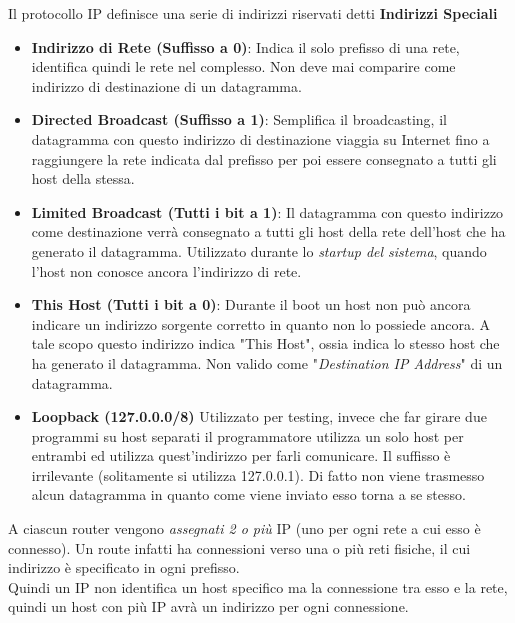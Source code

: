 \documentclass{article}
\newcounter{subsubsubsection}[subsubsection]
\begin{document}
                    Il protocollo IP definisce una serie di indirizzi riservati detti \textbf{Indirizzi Speciali}
                    \begin{itemize}
                        \item \textbf{Indirizzo di Rete (Suffisso a 0)}: Indica il solo prefisso di una rete, identifica quindi le rete nel complesso. Non deve mai comparire come indirizzo di destinazione di un datagramma.
                        \item \textbf{Directed Broadcast (Suffisso a 1)}: Semplifica il broadcasting, il datagramma con questo indirizzo di destinazione viaggia su Internet fino a raggiungere la rete indicata dal prefisso per poi essere consegnato a tutti gli host della stessa.
                        \item \textbf{Limited Broadcast (Tutti i bit a 1)}: Il datagramma con questo indirizzo come destinazione verrà consegnato a tutti gli host della rete dell'host che ha generato il datagramma. Utilizzato durante lo \textit{startup del sistema}, quando l'host non conosce ancora l'indirizzo di rete.
                        \item \textbf{This Host (Tutti i bit a 0)}: Durante il boot un host non può ancora indicare un indirizzo sorgente corretto in quanto non lo possiede ancora. A tale scopo questo indirizzo indica "This Host", ossia indica lo stesso host che ha generato il datagramma. Non valido come "\textit{Destination IP Address}" di un datagramma.
                        \item \textbf{Loopback (127.0.0.0/8)} Utilizzato per testing, invece che far girare due programmi su host separati il programmatore utilizza un solo host per entrambi ed utilizza quest'indirizzo per farli comunicare. Il suffisso è irrilevante (solitamente si utilizza 127.0.0.1). Di fatto non viene trasmesso alcun datagramma in quanto come viene inviato esso torna a se stesso. 
                    \end{itemize}

                    A ciascun router vengono \textit{assegnati 2 o più} IP (uno per ogni rete a cui esso è connesso). Un route infatti ha connessioni verso una o più reti fisiche, il cui indirizzo è specificato in ogni prefisso.\\
                    Quindi un IP non identifica un host specifico ma la connessione tra esso e la rete, quindi un host con più IP avrà un indirizzo per ogni connessione.
\end{document}
